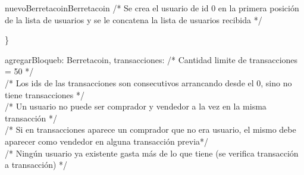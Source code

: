 \documentclass[10pt,a4paper]{article}
\begin{document}
\begin{tcolorbox}
        \begin{proc}{nuevoBerretacoin}{}{Berretacoin}
            \textcolor{babyblue}{/* Se crea el usuario de id 0 en la primera posición de la lista de usuarios y se le concatena la lista de usuarios recibida */} \\
        \end{proc} \}
        \vspace{0.3em}
        \begin{proc}{agregarBloque}{\Inout b: Berretacoin, \In transacciones: }{}
            \textcolor{babyblue}{/* Cantidad limite de transacciones = 50 */} \\
            \textcolor{babyblue}{/* Los ids de las transacciones son consecutivos arrancando desde el 0, sino no tiene transacciones */} \\
            \textcolor{babyblue}{/* Un usuario no puede ser comprador y vendedor a la vez en la misma transacción */} \\
            \textcolor{babyblue}{/* Si en transacciones aparece un comprador que no era usuario, el mismo debe aparecer como vendedor en alguna transacción previa*/} \\
            \textcolor{babyblue}{/* Ningún usuario ya existente gasta más de lo que tiene (se verifica transacción a transacción) */} \\

\end{proc}
\end{tcolorbox}
\end{document}
